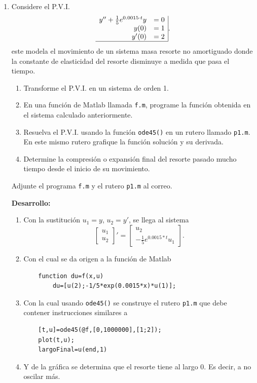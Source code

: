 \documentclass[11pt]{article}
\begin{document}
\begin{enumerate}

\item  Considere el P.V.I.
$$
\begin{array}{rl|}
y''+\frac{1}{5}e^{0.0015\cdot t}y & =0\\
y(0)	&=1\\
y'(0)	&=2\\ 
\hline
\end{array}.
$$
este modela el movimiento de un sistema masa resorte no amortiguado donde la constante de elasticidad del resorte disminuye a medida que pasa el tiempo.
\begin{enumerate}
\item Transforme el P.V.I. en un sistema de orden 1.
\item En una funci\'on de Matlab llamada \texttt{f.m}, programe la funci\'on obtenida en el sistema calculado anteriormente.
\item Resuelva el P.V.I. usando la funci\'on \texttt{ode45()} en un rutero llamado \texttt{p1.m}. En este mismo rutero grafique la funci\'on soluci\'on y su derivada.
\item Determine la compresi\'on o expansi\'on final del resorte pasado mucho tiempo desde el inicio de su movimiento.
\end{enumerate}
Adjunte el programa \texttt{f.m} y el rutero \texttt{p1.m} al correo.

\textbf{Desarrollo:}
\begin{enumerate}
	\item Con la sustituci\'on $u_1=y$, $u_2=y'$, se llega al sistema
    $$
    \begin{bmatrix}
    u_1\\u_2
    \end{bmatrix}'
    =\begin{bmatrix}
    u_2\\-\frac{1}{5} e^{0.0015*t}u_1
    \end{bmatrix}. 
    $$
    \item Con el cual se da origen a la funci\'on de Matlab
    \begin{lstlisting}
    function du=f(x,u)
    	du=[u(2);-1/5*exp(0.0015*x)*u(1)];
    \end{lstlisting} 
    \item Con la cual usando \texttt{ode45()} se construye el rutero \texttt{p1.m} que debe contener instrucciones similares a
    \begin{lstlisting}
    [t,u]=ode45(@f,[0,1000000],[1;2]);
    plot(t,u);
    largoFinal=u(end,1)
    \end{lstlisting} 
    \item Y de la gr\'afica se determina que el resorte tiene al largo $0$. Es decir, a no oscilar m\'as. 
\end{enumerate}


\end{enumerate}
\end{document}
